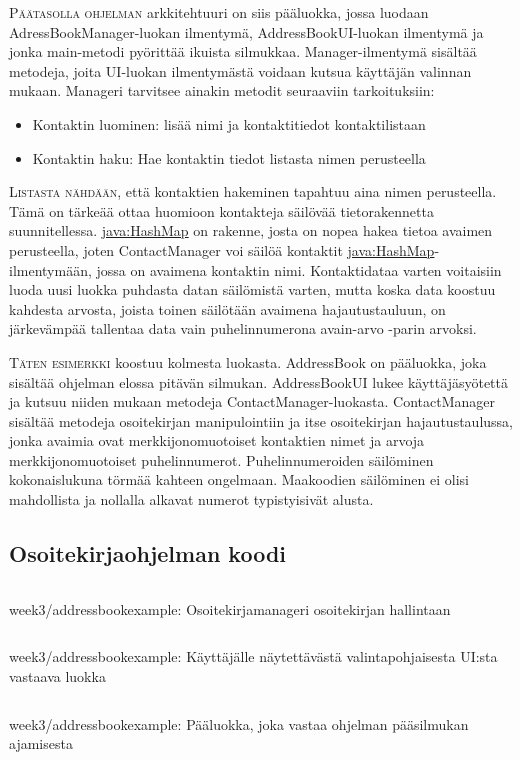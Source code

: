 \documentclass[openany]{book}
\newcommand{\newthought}[1]{\smallskip\textsc{#1}}
\newcommand{\java}[1]{\underline{\gls{java:#1}}}
\newcommand{\code}[3]{
	\begin{listing}
		\linespread{0.85}
		\inputminted{java}{OhjelmointiopasEsimerkit/src/#1/#2.java}
		\caption{#1: #3}
		\label{#1/#2}
	\end{listing}
}
\begin{document}
\newthought{Päätasolla ohjelman} arkkitehtuuri on siis pääluokka, jossa luodaan
AdressBookManager-luokan ilmentymä, AddressBookUI-luokan ilmentymä ja jonka main-metodi pyörittää
ikuista silmukkaa. Manager-ilmentymä sisältää metodeja, joita UI-luokan ilmentymästä voidaan
kutsua käyttäjän valinnan mukaan. Manageri tarvitsee ainakin metodit seuraaviin tarkoituksiin:

\begin{itemize}
	\item Kontaktin luominen: lisää nimi ja kontaktitiedot kontaktilistaan
	\item Kontaktin haku: Hae kontaktin tiedot listasta nimen perusteella
\end{itemize}

\newthought{Listasta nähdään}, että kontaktien hakeminen tapahtuu aina nimen perusteella. Tämä on
tärkeää ottaa huomioon kontakteja säilövää tietorakennetta suunnitellessa. \java{HashMap} on
rakenne, josta on nopea hakea tietoa avaimen perusteella, joten ContactManager voi säilöä
kontaktit \java{HashMap}-ilmentymään, jossa on avaimena kontaktin nimi. Kontaktidataa varten
voitaisiin luoda uusi luokka puhdasta datan säilömistä varten, mutta koska data koostuu kahdesta
arvosta, joista toinen säilötään avaimena hajautustauluun, on järkevämpää tallentaa data vain
puhelinnumerona avain-arvo -parin arvoksi.

\newthought{Täten esimerkki} koostuu kolmesta luokasta. AddressBook on pääluokka, joka sisältää
ohjelman elossa pitävän silmukan. AddressBookUI lukee käyttäjäsyötettä ja kutsuu niiden mukaan
metodeja ContactManager-luokasta. ContactManager sisältää metodeja osoitekirjan manipulointiin ja
itse osoitekirjan hajautustaulussa, jonka avaimia ovat merkkijonomuotoiset kontaktien nimet ja
arvoja merkkijonomuotoiset puhelinnumerot. Puhelinnumeroiden säilöminen kokonaislukuna törmää
kahteen ongelmaan. Maakoodien säilöminen ei olisi mahdollista ja nollalla alkavat numerot
typistyisivät alusta.


\subsection{Osoitekirjaohjelman koodi}
\label{osoitekirja koodi}

\code{week3/addressbookexample}{ContactManager}{Osoitekirjamanageri osoitekirjan hallintaan}
\code{week3/addressbookexample}{AddressBookUI}{Käyttäjälle näytettävästä valintapohjaisesta UI:sta
vastaava luokka}
\code{week3/addressbookexample}{AddressBook}{Pääluokka, joka vastaa ohjelman pääsilmukan ajamisesta}
\end{document}
